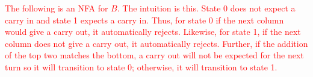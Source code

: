 \textcolor{red}{The following is an NFA for $B$. The intuition is this. State 0 does not expect a carry in and state 1 expects a carry in. Thus, for state 0 if the next column would give a carry out, it automatically rejects. Likewise, for state 1, if the next column does not give a carry out, it automatically rejects. Further, if the addition of the top two matches the bottom, a carry out will not be expected for the next turn so it will transition to state 0; otherwise, it will transition to state 1.}
\begin{figure}[h]
\centering
{}
\end{figure}